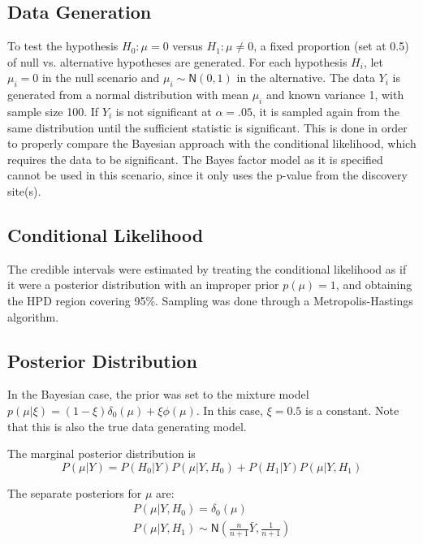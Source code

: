 \documentclass[AMA,STIX1COL]{WileyNJD-v2}\usepackage[]{graphicx}\usepackage[]{color}
\begin{document}
\subsection{Data Generation}

To test the hypothesis $H_0: \mu = 0$ versus  $H_1: \mu \neq 0$, a fixed proportion (set at 0.5) of null vs. alternative hypotheses are generated. For each hypothesis $H_i$, let $\mu_i = 0$ in the null scenario and $\mu_i \sim \textsf{N}(0,1)$ in the alternative. The data $Y_i$ is generated from a normal distribution with mean $\mu_i$ and known variance 1, with sample size 100. If $Y_i$ is not significant at $\alpha = .05$, it is sampled again from the same distribution until the sufficient statistic is significant. This is done in order to properly compare the Bayesian approach with the conditional likelihood, which requires the data to be significant. The Bayes factor model as it is specified cannot be used in this scenario, since it only uses the p-value from the discovery site(s).

\subsection{Conditional Likelihood}

The credible intervals were estimated by treating the conditional likelihood as if it were a posterior distribution with an improper prior $p(\mu) = 1$, and obtaining the HPD region covering 95\%. Sampling was done through a Metropolis-Hastings algorithm.

\subsection{Posterior Distribution}




In the Bayesian case, the prior was set to the mixture model $p(\mu|\xi) = (1-\xi ) \delta_0(\mu)+ \xi\phi(\mu)$. In this case, $\xi = 0.5$ is a constant. Note that this is also the true data generating model. 

The marginal posterior distribution is 
\begin{equation}
P(\mu | Y ) = P(H_0|Y)P(\mu|Y, H_0) + P(H_1|Y)P(\mu|Y, H_1)
\end{equation}

The separate posteriors for $\mu$ are:
\begin{gather}
P(\mu|Y, H_0) = \delta_0(\mu)\\
P(\mu|Y, H_1) \sim \textsf{N}(\frac{n}{n+1}\bar Y, \frac{1}{n+1})
\end{gather}
\end{document}
